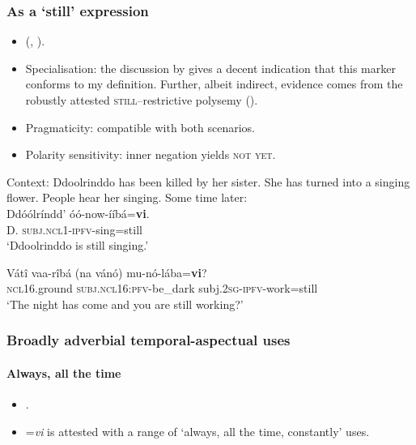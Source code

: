 \subsubsection{As a  \lq still\rq{ }expression}\largerpage[2]
\begin{itemize}
	\item \citeauthor{Guerois2015} (\citeyear[310–311]{Guerois2015}, \citeyear{Guerois2021}).
	\item Specialisation: the discussion by \textcite{Guerois2021} gives a decent indication that this marker conforms to my definition. Further, albeit indirect, evidence comes from the robustly attested \textsc{still}–restrictive polysemy ().
	\item Pragmaticity: compatible with both scenarios.
	\item Polarity sensitivity: inner negation yields \textsc{not yet}.
\end{itemize}
\begin{exe}
	\ex
	Context: Ddoolrinddo has been killed by her sister. She has turned into a singing flower. People hear her singing. Some time later:\\
	\gll Ddóólríndd' óó-now-ííbá=\textbf{vi}.\\
	D. \textsc{subj}.\textsc{ncl}1-\textsc{ipfv}-sing=still\\
	\glt \lq Ddoolrinddo is still singing.' \parencite[588]{Guerois2015}
	
	\ex
	\gll Vátî vaa-rîbá {(na vánó)} mu-nó-lába=\textbf{vi}?\\
	\textsc{ncl}16.ground \textsc{subj}.\textsc{ncl}16:\textsc{pfv}-be\_dark \phantom{(}{until now} subj.2\textsc{sg}-\textsc{ipfv}-work=still\\
	\glt \lq The night has come and you are still working?\rq{ }\parencite[168]{Guerois2021}
\end{exe}

\subsubsection{Broadly adverbial temporal-aspectual uses}
\paragraph{Always, all the time}
\label{appendixChuwabuAlways}
\begin{itemize}
	\item \textcite{Guerois2021}.
	\item =\textit{vi} is attested with a range of \lq always, all the time, constantly\rq{ }uses.
\end{itemize}

